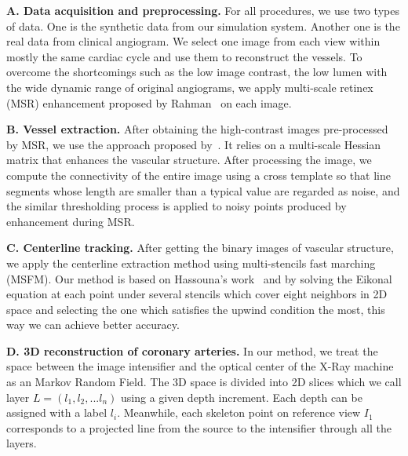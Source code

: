 \documentclass[10pt, conference, compsocconf]{IEEEtran}
\begin{document}
\textbf{A. Data acquisition and preprocessing.} For all procedures, we use
two types of data. One is the synthetic data from our simulation system.
Another one is the real data from clinical angiogram. We select one image
from each view within mostly the same cardiac cycle and use them to
reconstruct the vessels. To overcome the shortcomings such as the low image
contrast, the low lumen with the wide dynamic range of original angiograms,
we apply multi-scale retinex (MSR) enhancement proposed by
Rahman~\cite{rahman1996multi} on each image.

\textbf{B. Vessel extraction.} After obtaining the high-contrast
images pre-processed by MSR, we use the approach proposed
by~\cite{Frangi}. It relies on a multi-scale Hessian matrix that
enhances the vascular structure. After processing the image, we
compute the connectivity of the entire image using a cross template so
that line segments whose length are smaller than a typical value are
regarded as noise, and the similar thresholding process is applied to
noisy points produced by enhancement during MSR.

\textbf{C. Centerline tracking.} After getting the binary images of
vascular structure, we apply the centerline extraction method using
multi-stencils fast marching (MSFM). Our method is based on Hassouna's
work~\cite{Hassouna} and by solving the Eikonal equation at each point
under several stencils which cover eight neighbors in 2D space and
selecting the one which satisfies the upwind condition the most, this
way we can achieve better accuracy.



\textbf{D. 3D reconstruction of coronary arteries.} In our method, we treat
the space between the image intensifier and the optical center of the X-Ray
machine as an Markov Random Field. The 3D space is divided into 2D slices
which we call layer $L=(l_1, l_2, ... l_n)$ using a given depth increment.
Each depth can be assigned with a label $l_{i}$. Meanwhile, each skeleton
point on reference view $I_{1}$ corresponds to a projected line from the
source to the intensifier through all the layers.

\end{document}
